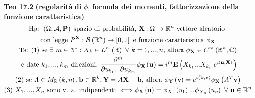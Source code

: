 \documentclass{article}
\begin{document}
\textbf{Teo 17.2 (regolarit\`{a} di }$\phi $, \textbf{formula dei momenti,
fattorizzazione della funzione caratteristica)}%
\begin{gather*}
\text{Hp: }\left( \Omega ,\mathcal{A},\mathbf{P}\right) \text{ spazio di
probabilit\`{a}, }\mathbf{X}:\Omega \rightarrow 
\mathbb{R}
^{n}\text{ vettore aleatorio } \\
\text{con legge }P^{\mathbf{X}}:\mathcal{B}\left( 
\mathbb{R}
^{n}\right) \rightarrow \left[ 0,1\right] \text{ e funzione caratteristica }%
\phi _{\mathbf{X}} \\
\text{Ts: (1) se }\exists \text{ }m\in 
\mathbb{N}
^{\ast }:X_{k}\in L^{m}\left( 
\mathbb{R}
\right) \text{ }\forall \text{ }k=1,...,n\text{, allora }\phi _{\mathbf{X}%
}\in C^{m}\left( 
\mathbb{R}
^{n},%
\mathbb{C}
\right) \\
\text{ e date }k_{1},...,k_{m}\text{ direzioni, }\frac{\partial ^{m}}{%
\partial u_{k_{1}}...\partial u_{k_{m}}}\phi _{\mathbf{X}}\left( \mathbf{u}%
\right) =i^{m}\mathbf{E}\left( X_{k_{1}}...X_{k_{m}}e^{i\left\langle \mathbf{%
u,X}\right\rangle }\right) \\
\text{(2) se }A\in M_{%
\mathbb{R}
}\left( k,n\right) ,\mathbf{b}\in 
\mathbb{R}
^{k},\mathbf{Y}=A\mathbf{X+b}\text{, allora }\phi _{\mathbf{Y}}\left( 
\mathbf{v}\right) =e^{i\left\langle \mathbf{b,v}\right\rangle }\phi _{%
\mathbf{X}}\left( A^{T}\mathbf{v}\right) \\
\text{(3) }X_{1},...,X_{n}\text{ sono v. a. indipendenti }%
\Longleftrightarrow \phi _{\mathbf{X}}\left( \mathbf{u}\right) =\phi
_{X_{1}}\left( u_{1}\right) ...\phi _{X_{n}}\left( u_{n}\right) \text{ }%
\forall \text{ }\mathbf{u}\in 
\mathbb{R}
^{n}
\end{gather*}
\end{document}
